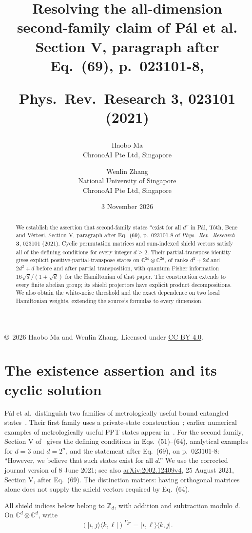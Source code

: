 \documentclass[11pt]{article}
\title{Resolving the all-dimension second-family claim of P\'al et al.\\
\large Section V, paragraph after Eq.\ (69), p.\ 023101-8,\par
Phys.\ Rev.\ Research \textbf{3}, 023101 (2021)}
\author{Haobo Ma\\\small ChronoAI Pte Ltd, Singapore
\and Wenlin Zhang\\\small National University of Singapore\\\small ChronoAI Pte Ltd, Singapore}
\date{3 November 2026}
\newcommand{\ket}[1]{\lvert #1\rangle}
\newcommand{\bra}[1]{\langle #1\rvert}
\begin{document}
\maketitle
\begin{abstract}
We establish the assertion that second-family states ``exist for all $d$''
in P\'al, T\'oth, Bene and V\'ertesi, Section V, paragraph after Eq.\ (69),
p.\ 023101-8 of \emph{Phys.\ Rev.\ Research} \textbf{3}, 023101 (2021).
Cyclic permutation matrices and sum-indexed shield vectors satisfy all
of the defining conditions for every integer $d\geq2$.
Their partial-transpose identity gives explicit positive-partial-transpose
states on $\mathbb C^{2d}\otimes\mathbb C^{2d}$, of ranks $d^2+2d$
and $2d^2+d$ before and after partial transposition, with quantum Fisher
information $16\sqrt d/(1+\sqrt d)$ for the Hamiltonian of that paper.
The construction extends to every finite abelian group; its shield
projectors have explicit product decompositions.
We also obtain the white-noise threshold and the exact dependence on two
local Hamiltonian weights, extending the source's formulas to every dimension.
\end{abstract}
\begin{center}\small
\copyright\ 2026 Haobo Ma and Wenlin Zhang.
Licensed under \href{https://creativecommons.org/licenses/by/4.0/}{CC BY 4.0}.
\end{center}

\section{The existence assertion and its cyclic solution}

P\'al et al.\ distinguish two families of metrologically useful bound
entangled states~\cite{Pal2021}. Their first family uses a private-state
construction~\cite{Badziag2014}; earlier numerical examples of metrologically
useful PPT states appear in~\cite{Toth2018}.
For the second family, Section V of~\cite{Pal2021} gives the defining
conditions in Eqs.\ (51)--(64), analytical examples for $d=3$ and $d=2^n$,
and the statement after Eq.\ (69), on p.\ 023101-8:
``However, we believe that such states exist for all $d$.''
We use the corrected journal version of 8 June 2021; see also
\href{https://arxiv.org/abs/2002.12409v4}{arXiv:2002.12409v4},
25 August 2021, Section V, after Eq.\ (69).
The distinction matters: having orthogonal matrices alone does not supply
the shield vectors required by Eq.\ (64).

All shield indices below belong to $\mathbb Z_d$, with addition and
subtraction modulo $d$. On $\mathbb C^d\otimes\mathbb C^d$, write
\[
  (\ket{i,j}\bra{k,\ell})^{\Gamma_{B'}}=
     \ket{i,\ell}\bra{k,j}.
\]
\end{document}

